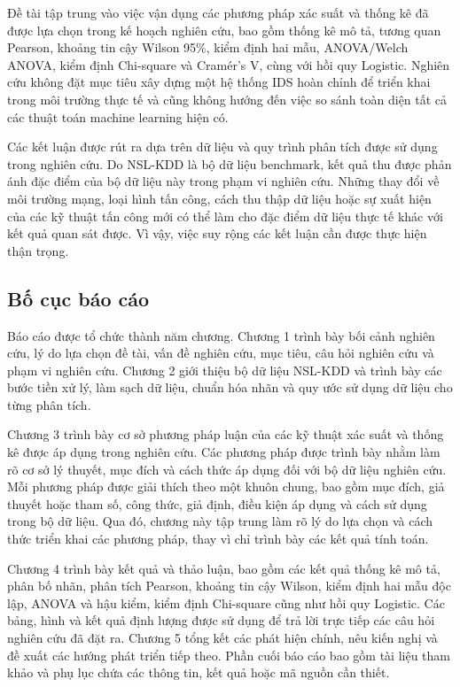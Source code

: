 \documentclass[../main.tex]{subfiles}
\begin{document}
Đề tài tập trung vào việc vận dụng các phương pháp xác suất và thống kê đã được lựa chọn trong kế hoạch nghiên cứu, bao gồm thống kê mô tả, tương quan Pearson, khoảng tin cậy Wilson 95\%, kiểm định hai mẫu, ANOVA/Welch ANOVA, kiểm định Chi-square và Cramér's V, cùng với hồi quy Logistic. Nghiên cứu không đặt mục tiêu xây dựng một hệ thống IDS hoàn chỉnh để triển khai trong môi trường thực tế và cũng không hướng đến việc so sánh toàn diện tất cả các thuật toán machine learning hiện có.

Các kết luận được rút ra dựa trên dữ liệu và quy trình phân tích được sử dụng trong nghiên cứu. Do NSL-KDD là bộ dữ liệu benchmark, kết quả thu được phản ánh đặc điểm của bộ dữ liệu này trong phạm vi nghiên cứu. Những thay đổi về môi trường mạng, loại hình tấn công, cách thu thập dữ liệu hoặc sự xuất hiện của các kỹ thuật tấn công mới có thể làm cho đặc điểm dữ liệu thực tế khác với kết quả quan sát được. Vì vậy, việc suy rộng các kết luận cần được thực hiện thận trọng.

\subsection{Bố cục báo cáo}

Báo cáo được tổ chức thành năm chương. Chương 1 trình bày bối cảnh nghiên cứu, lý do lựa chọn đề tài, vấn đề nghiên cứu, mục tiêu, câu hỏi nghiên cứu và phạm vi nghiên cứu. Chương 2 giới thiệu bộ dữ liệu NSL-KDD và trình bày các bước tiền xử lý, làm sạch dữ liệu, chuẩn hóa nhãn và quy ước sử dụng dữ liệu cho từng phân tích.

Chương 3 trình bày cơ sở phương pháp luận của các kỹ thuật xác suất và thống kê được áp dụng trong nghiên cứu. Các phương pháp được trình bày nhằm làm rõ cơ sở lý thuyết, mục đích và cách thức áp dụng đối với bộ dữ liệu nghiên cứu. Mỗi phương pháp được giải thích theo một khuôn chung, bao gồm mục đích, giả thuyết hoặc tham số, công thức, giả định, điều kiện áp dụng và cách sử dụng trong bộ dữ liệu. Qua đó, chương này tập trung làm rõ lý do lựa chọn và cách thức triển khai các phương pháp, thay vì chỉ trình bày các kết quả tính toán.

Chương 4 trình bày kết quả và thảo luận, bao gồm các kết quả thống kê mô tả, phân bố nhãn, phân tích Pearson, khoảng tin cậy Wilson, kiểm định hai mẫu độc lập, ANOVA và hậu kiểm, kiểm định Chi-square cũng như hồi quy Logistic. Các bảng, hình và kết quả định lượng được sử dụng để trả lời trực tiếp các câu hỏi nghiên cứu đã đặt ra. Chương 5 tổng kết các phát hiện chính, nêu kiến nghị và đề xuất các hướng phát triển tiếp theo. Phần cuối báo cáo bao gồm tài liệu tham khảo và phụ lục chứa các thông tin, kết quả hoặc mã nguồn cần thiết.
\end{document}
